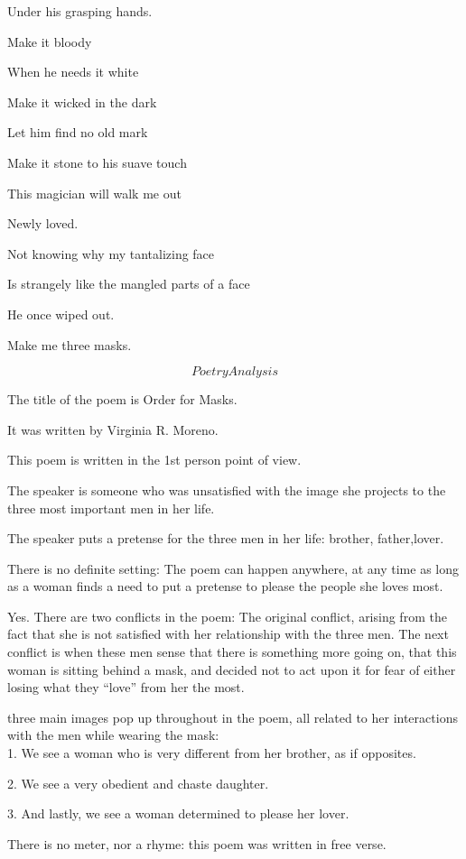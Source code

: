 \documentclass{slides}
\begin{document}
	Under his grasping hands.

	Make it bloody

	When he needs it white

	Make it wicked in the dark

	Let him find no old mark

	Make it stone to his suave touch

	This magician will walk me out

	Newly loved.

	Not knowing why my tantalizing face

	Is strangely like the mangled parts of a face

	He once wiped out.

	Make me three masks.

	\newpage

	\[Poetry Analysis\]

	The title of the poem is Order for Masks.

	It was written by Virginia R. Moreno.

	This poem is written in the 1st person point of view.

	The speaker is someone who was unsatisfied with the image she projects to the three most important men in her life.

	The speaker puts a pretense for the three men in her life: brother, father,lover.

	There is no definite setting: The poem can happen anywhere, at any time as long as a woman finds a need to put a pretense to please the people she loves most.

	Yes. There are two conflicts in the poem: The original conflict, arising from the fact that she is not satisfied with her relationship with the three men. The next conflict is when these men sense that there is something more going on, that this woman is sitting behind a mask, and decided not to act upon it for fear of either losing what they ``love'' from her the most.

	three main images pop up throughout in the poem, all related to her interactions with the men while wearing the mask:\\
	1. We see a woman who is very different from her brother, as if opposites.

	2. We see a very obedient and chaste daughter.

	3. And lastly, we see a woman determined to please her lover.

	There is no meter, nor a rhyme: this poem was written in free verse.
\end{document}
